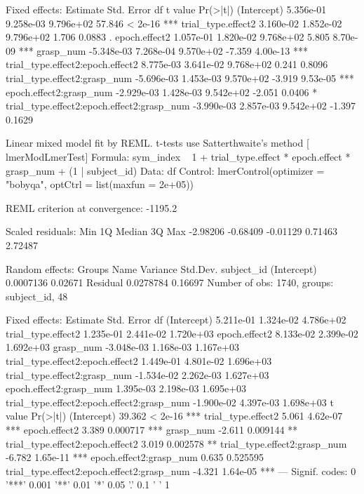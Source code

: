 Fixed effects:
                                             Estimate Std. Error         df     t value     Pr(>|t|)    
(Intercept)                                 5.356e-01  9.258e-03  9.796e+02      57.846     < 2e-16 ***
trial_type.effect2                          3.160e-02  1.852e-02  9.796e+02      1.706      0.0883 .  
epoch.effect2                               1.057e-01  1.820e-02  9.768e+02      5.805      8.70e-09 ***
grasp_num                                  -5.348e-03  7.268e-04  9.570e+02     -7.359      4.00e-13 ***
trial_type.effect2:epoch.effect2            8.775e-03  3.641e-02  9.768e+02      0.241      0.8096    
trial_type.effect2:grasp_num               -5.696e-03  1.453e-03  9.570e+02     -3.919      9.53e-05 ***
epoch.effect2:grasp_num                    -2.929e-03  1.428e-03  9.542e+02     -2.051      0.0406 *  
trial_type.effect2:epoch.effect2:grasp_num -3.990e-03  2.857e-03  9.542e+02     -1.397      0.1629    




Linear mixed model fit by REML. t-tests use Satterthwaite's method [
lmerModLmerTest]
Formula: sym_index ~ 1 + trial_type.effect * epoch.effect * grasp_num +  
    (1 | subject_id)
   Data: df
Control: lmerControl(optimizer = "bobyqa", optCtrl = list(maxfun = 2e+05))

REML criterion at convergence: -1195.2

Scaled residuals: 
     Min       1Q   Median       3Q      Max 
-2.98206 -0.68409 -0.01129  0.71463  2.72487 

Random effects:
 Groups     Name        Variance  Std.Dev.
 subject_id (Intercept) 0.0007136 0.02671 
 Residual               0.0278784 0.16697 
Number of obs: 1740, groups:  subject_id, 48

Fixed effects:
                                             Estimate Std. Error         df
(Intercept)                                 5.211e-01  1.324e-02  4.786e+02
trial_type.effect2                          1.235e-01  2.441e-02  1.720e+03
epoch.effect2                               8.133e-02  2.399e-02  1.692e+03
grasp_num                                  -3.048e-03  1.168e-03  1.167e+03
trial_type.effect2:epoch.effect2            1.449e-01  4.801e-02  1.696e+03
trial_type.effect2:grasp_num               -1.534e-02  2.262e-03  1.627e+03
epoch.effect2:grasp_num                     1.395e-03  2.198e-03  1.695e+03
trial_type.effect2:epoch.effect2:grasp_num -1.900e-02  4.397e-03  1.698e+03
                                           t value Pr(>|t|)    
(Intercept)                                 39.362  < 2e-16 ***
trial_type.effect2                           5.061 4.62e-07 ***
epoch.effect2                                3.389 0.000717 ***
grasp_num                                   -2.611 0.009144 ** 
trial_type.effect2:epoch.effect2             3.019 0.002578 ** 
trial_type.effect2:grasp_num                -6.782 1.65e-11 ***
epoch.effect2:grasp_num                      0.635 0.525595    
trial_type.effect2:epoch.effect2:grasp_num  -4.321 1.64e-05 ***
---
Signif. codes:  0 '***' 0.001 '**' 0.01 '*' 0.05 '.' 0.1 ' ' 1


